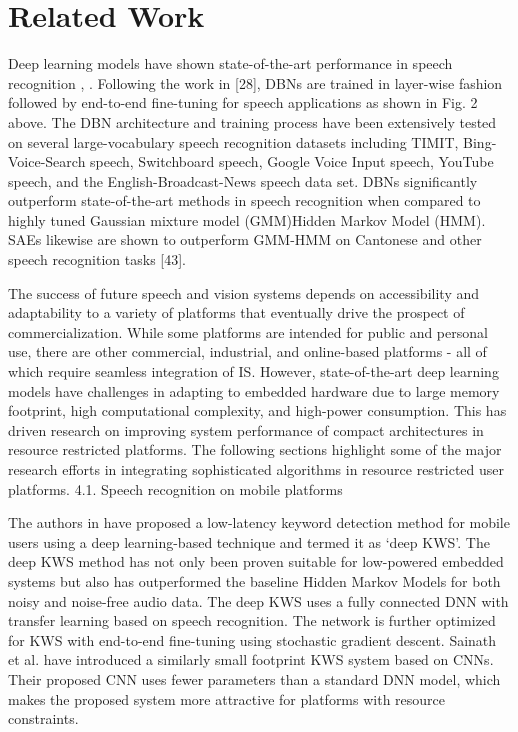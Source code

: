 
\section{Related Work}

Deep learning models have shown state-of-the-art performance in speech recognition \cite{hinton2012deep}, \cite{sainath2013deep}. Following the work in [28], DBNs are trained in layer-wise fashion followed by end-to-end fine-tuning for speech applications as shown in Fig. 2 above. The DBN architecture and training process have been extensively tested on several large-vocabulary speech recognition datasets including TIMIT, Bing-Voice-Search speech, Switchboard speech, Google Voice Input speech, YouTube speech, and the English-Broadcast-News speech data set. DBNs significantly outperform state-of-the-art methods in speech recognition when compared to highly tuned Gaussian mixture model (GMM)Hidden Markov Model (HMM). SAEs likewise are shown to outperform GMM-HMM on Cantonese and other speech recognition tasks [43].


The success of future speech and vision systems depends on accessibility and adaptability to a variety of platforms that eventually drive the prospect of commercialization. While some platforms are intended for public and personal use, there are other commercial, industrial, and online-based platforms - all of which require seamless integration of IS. However, state-of-the-art deep learning models have challenges in adapting to embedded hardware due to large memory footprint, high computational complexity, and high-power consumption. This has driven research on improving system performance of compact architectures in resource restricted platforms. The following sections highlight some of the major research efforts in integrating sophisticated algorithms in resource restricted user platforms.
4.1. Speech recognition on mobile platforms


The authors in \cite{chen2014small} have proposed a low-latency keyword detection method for mobile users using a deep learning-based technique and termed it as ‘deep KWS’. The deep KWS method has not only been proven suitable for low-powered embedded systems but also has outperformed the baseline Hidden Markov Models for both noisy and noise-free audio data. The deep KWS uses a fully connected DNN with transfer learning  based on speech recognition. The network is further optimized for KWS with end-to-end fine-tuning using stochastic gradient descent. Sainath et al. \cite{sainath2015convolutional} have introduced a similarly small footprint KWS system based on CNNs. Their proposed CNN uses fewer parameters than a standard DNN model, which makes the proposed system more attractive for platforms with resource constraints. 

